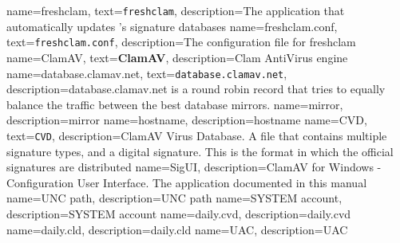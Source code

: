 {
    name={freshclam},
    text={\texttt{freshclam}},
    description={The application that automatically updates \ClamAV's signature databases}
}
{
    name={freshclam.conf},
    text={\texttt{freshclam.conf}},
    description={The configuration file for \gls{freshclam}}
}
{
    name={ClamAV},
    text={\textbf{ClamAV}},
    description={Clam AntiVirus engine}
}
{
    name={database.clamav.net},
    text={\texttt{database.clamav.net}},
    description={database.clamav.net is a round robin record that tries to
	equally balance the traffic between the best database mirrors.}
}
{
    name={mirror},
    description={mirror}
}
{
    name={hostname},
    description={hostname}
}
{
    name={CVD},
    text={\texttt{CVD}},
    description={ClamAV Virus Database. A file that contains multiple signature types, and a digital signature.
	This is the format in which the official signatures are distributed}
}
{
    name={SigUI},
    description={ClamAV for Windows - Configuration User Interface. The
	application documented in this manual}
}
{
    name={UNC path},
    description={UNC path}
}
{
    name={SYSTEM account},
    description={SYSTEM account}
}
{
    name={daily.cvd},
    description={daily.cvd}
}
{
    name={daily.cld},
    description={daily.cld}
}
{
    name={UAC},
    description={UAC}
}
